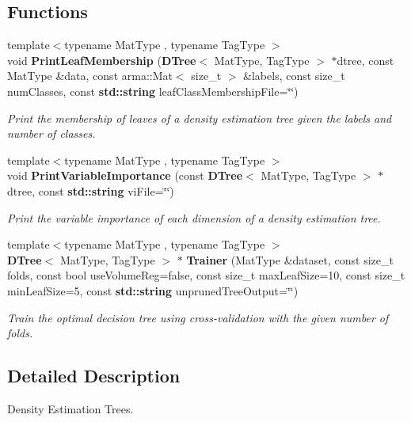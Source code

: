 \subsection*{Functions}
\begin{DoxyCompactItemize}
\item 
{\footnotesize template$<$typename Mat\+Type , typename Tag\+Type $>$ }\\void {\bf Print\+Leaf\+Membership} ({\bf D\+Tree}$<$ Mat\+Type, Tag\+Type $>$ $\ast$dtree, const Mat\+Type \&data, const arma\+::\+Mat$<$ size\+\_\+t $>$ \&labels, const size\+\_\+t num\+Classes, const {\bf std\+::string} leaf\+Class\+Membership\+File=\char`\"{}\char`\"{})
\begin{DoxyCompactList}\small\item\em Print the membership of leaves of a density estimation tree given the labels and number of classes. \end{DoxyCompactList}\item 
{\footnotesize template$<$typename Mat\+Type , typename Tag\+Type $>$ }\\void {\bf Print\+Variable\+Importance} (const {\bf D\+Tree}$<$ Mat\+Type, Tag\+Type $>$ $\ast$dtree, const {\bf std\+::string} vi\+File=\char`\"{}\char`\"{})
\begin{DoxyCompactList}\small\item\em Print the variable importance of each dimension of a density estimation tree. \end{DoxyCompactList}\item 
{\footnotesize template$<$typename Mat\+Type , typename Tag\+Type $>$ }\\{\bf D\+Tree}$<$ Mat\+Type, Tag\+Type $>$ $\ast$ {\bf Trainer} (Mat\+Type \&dataset, const size\+\_\+t folds, const bool use\+Volume\+Reg=false, const size\+\_\+t max\+Leaf\+Size=10, const size\+\_\+t min\+Leaf\+Size=5, const {\bf std\+::string} unpruned\+Tree\+Output=\char`\"{}\char`\"{})
\begin{DoxyCompactList}\small\item\em Train the optimal decision tree using cross-\/validation with the given number of folds. \end{DoxyCompactList}\end{DoxyCompactItemize}


\subsection{Detailed Description}
Density Estimation Trees. 

